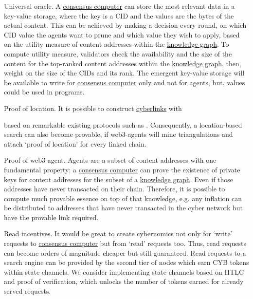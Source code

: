 \documentclass[8pt,oneside]{amsart}
\newcommand{\linkgreen}[2]{\href{#1}{\color{green}{#2}}}
\begin{document}
Universal oracle. A {\hyperref[consensus-computer]{consensus computer}} can store the most relevant data in a key-value storage, where the key is a CID and the values are the bytes of the actual content. This can be achieved by making a decision every round, on which CID value the agents want to prune and which value they wish to apply, based on the utility measure of content addresses within the {\hyperref[knowledge-graph]{knowledge graph}}. To compute utility measure, validators check the availability and the size of the content for the top-ranked content addresses within the {\hyperref[knowledge-graph]{knowledge graph}}, then, weight on the size of the CIDs and its rank. The emergent key-value storage will be available to write for {\hyperref[consensus-computer]{consensus computer}} only and not for agents, but, values could be used in programs.

Proof of location. It is possible to construct {\hyperref[cyberlinks]{cyberlinks}} with \item \linkgreen{https://ipfs.io/ipfs/QmZYKGuLHf2h1mZrhiP2FzYsjj3tWt2LYduMCRbpgi5pKG}{proof-of-location} based on remarkable existing protocols such as \linkgreen{https://ipfs.io/ipfs/QmZYKGuLHf2h1mZrhiP2FzYsjj3tWt2LYduMCRbpgi5pKG}{Foam}. Consequently, a location-based search can also become provable, if web3-agents will mine triangulations and attach ‘proof of location’ for every linked chain.

Proof of web3-agent. Agents are a subset of content addresses with one fundamental property: a {\hyperref[consensus-computer]{consensus computer}} can prove the existence of private keys for content addresses for the subset of a {\hyperref[knowledge-graph]{knowledge graph}}. Even if those addresses have never transacted on their chain. Therefore, it is possible to compute much provable essence on top of that knowledge, e.g. any inflation can be distributed to addresses that have never transacted in the cyber network but have the provable link required.

Read incentives. It would be great to create cybernomics not only for ‘write’ requests to {\hyperref[consensus-computer]{consensus computer}} but from ‘read’ requests too. Thus, read requests can become orders of magnitude cheaper but still guaranteed. Read requests to a search engine can be provided by the second tier of nodes which earn CYB tokens within state channels. We consider implementing state channels based on HTLC and proof of verification, which unlocks the number of tokens earned for already served requests.
\end{document}
